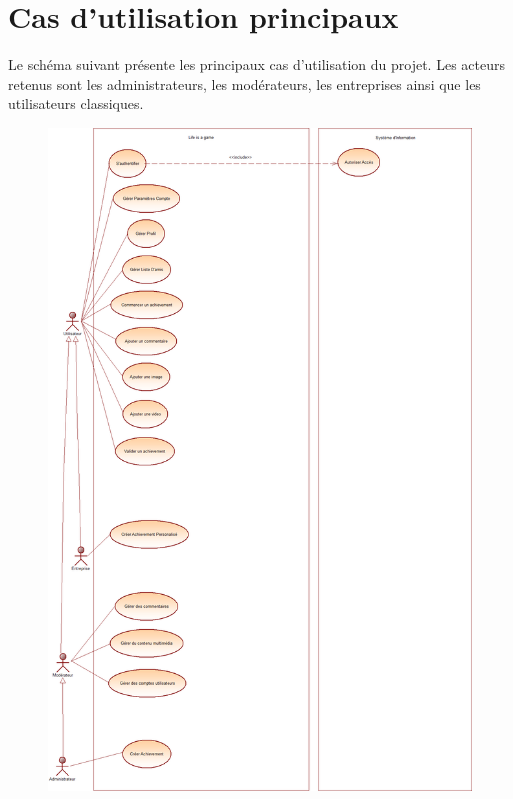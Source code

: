 \documentclass{life-fr}
\begin{document}
\section{Cas d'utilisation principaux}

Le schéma suivant présente les principaux cas d'utilisation du projet. Les acteurs retenus sont les administrateurs, les modérateurs, les entreprises ainsi que les utilisateurs classiques.

\newpage

\begin{figure}[H]
  \begin{center}
    \includegraphics[width=15cm]{img/use_case_principaux.png}
  \end{center}
\end{figure}
\end{document}
